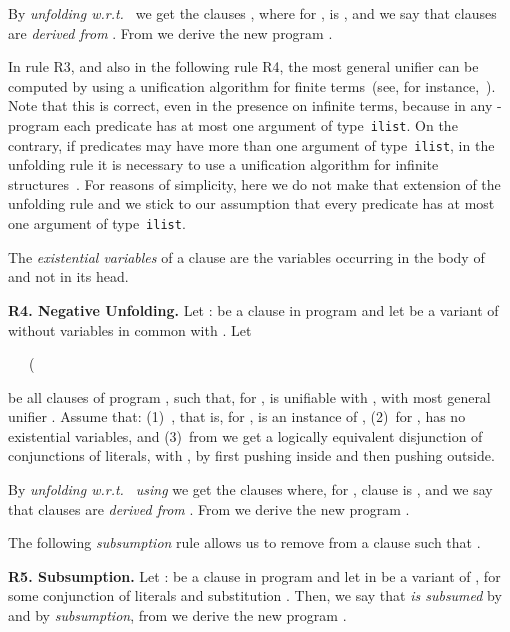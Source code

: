 \documentclass[english]{tlp}
\begin{document}
\noindent By \emph{unfolding  w.r.t.~} we get
the clauses , where for ,  is , and we say that clauses  are {\it{derived from}} . From  we
derive the new program .

\medskip{}

In rule R3, and also in the following rule R4, the 
most general unifier can be computed by using a unification
algorithm for finite terms~(see, for instance,~\cite{Llo87}). 
Note that 
this is correct, even in the presence on infinite terms, 
because in any -program
each predicate has at most one argument of type~\texttt{ilist}.
On the contrary, if predicates may have
more than one argument of type~\texttt{ilist},
in the unfolding rule it is necessary to use 
a unification algorithm for infinite structures~\cite{Col82}.
For reasons of simplicity, here
we do not make that extension of the unfolding rule
and we stick to our assumption
that every predicate has at most one argument of type~\texttt{ilist}.

\medskip

The {\em existential variables} of a clause  are the
variables occurring in the body of~ and not in its head.

\medskip

\noindent \textbf{R4. Negative Unfolding.}\label{rule:neg-unfold}
Let :  be a
clause in program  and let  be a variant of 
without variables in common with . Let

\smallskip

 \ \ \ (

\smallskip{}

\noindent be all clauses of program , such that, for ,  is unifiable with , with most
general unifier . Assume that: (1)~, that is, for
,  is an instance of , (2)~for
,  has no existential variables,
and (3)~from  we get a logically equivalent disjunction  of conjunctions of literals, with , by first pushing  inside and then pushing  outside.

\noindent By \emph{unfolding   w.r.t.~}
 \emph{using } we get the clauses  where, for , clause  is
, and we say that clauses
 are {\it{derived from}} .
From  we derive the new program .

\medskip

\noindent The following \emph{subsumption} rule allows us to remove
from  a clause  such that
.

\medskip

\noindent \textbf{R5. Subsumption.}\label{rule:subsumption} Let
:  be a clause in program  and let
 in  be a variant of , for some conjunction of literals  and substitution
. Then, we say that  {\it is subsumed} by
 and by  \emph{subsumption}, from  we derive the
new program .
\end{document}
